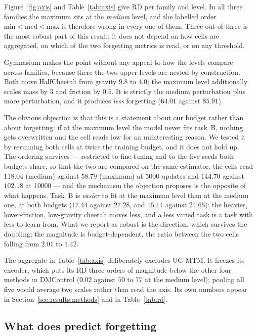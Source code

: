 Figure~\ref{fig:axis} and Table~\ref{tab:axis} give RD per family and level. In
all three families the maximum sits at the \emph{medium} level, and the
labelled order $\text{min} < \text{med} < \text{max}$ is therefore wrong in
every one of them.
Three out of three is the most robust part of this result: it does not depend on
how cells are aggregated, on which of the two forgetting metrics is read, or on
any threshold.

Gymnasium makes the point without any appeal to how the levels compare across
families, because there the two upper levels are nested by construction. Both
move HalfCheetah from gravity $9.8$ to $4.0$; the maximum level additionally
scales mass by $3$ and friction by $0.5$. It is strictly the medium
perturbation plus more perturbation, and it produces \emph{less} forgetting
($64.01$ against $85.91$).

The obvious objection is that this is a statement about our budget rather than
about forgetting: if at the maximum level the model never fits task~B, nothing
gets overwritten and the cell reads low for an uninteresting reason. We tested
it by rerunning both cells at twice the training budget, and it does not hold
up. The ordering survives --- restricted to fine-tuning and to the five seeds
both budgets share, so that the two are compared on the same estimator, the
cells read $118.04$ (medium) against $58.79$ (maximum) at 5000 updates and
$144.70$ against $102.18$ at 10000 --- and the mechanism the objection proposes
is the opposite of what happens. Task~B is
\emph{easier} to fit at the maximum level than at the medium one, at both
budgets ($17.44$ against $27.28$, and $15.14$ against $24.65$): the heavier,
lower-friction, low-gravity cheetah moves less, and a less varied task is a
task with less to learn from. What we report as robust is the direction, which
survives the doubling; the magnitude is budget-dependent, the ratio between the
two cells falling from $2.01$ to $1.42$.

The aggregate in Table~\ref{tab:axis} deliberately excludes UG-MTM. It freezes
its encoder, which puts its RD three orders of magnitude below the other four
methods in DMControl ($0.02$ against $50$ to $77$ at the medium level); pooling
all five would average two scales rather than read the axis. Its own numbers appear in
Section~\ref{sec:results:methods} and in Table~\ref{tab:rd}.

\subsection{What does predict forgetting}
\label{sec:results:predictors}

